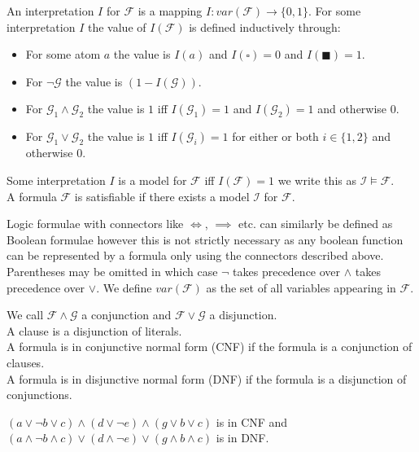 \begin{definition}
An interpretation $I$ for $\mathcal{F}$ is a mapping $I\colon var(\mathcal{F}) \to \{0,1\}$.
For some interpretation $I$ the value of $I(\mathcal{F})$ is defined inductively through:
\begin{itemize}
    \item For some atom $a$ the value is $I(a)$ and $I\left(\square\right)=0$ and $I\left(\blacksquare\right)=1$.
    \item For $\neg\mathcal{G}$ the value is $\left(1-I(\mathcal{G})\right)$.
    \item For $\mathcal{G}_1 \land \mathcal{G}_2$ the value is $1$ iff $I(\mathcal{G}_1)=1$ and $I(\mathcal{G}_2)=1$  and otherwise $0$.
    \item For $\mathcal{G}_1 \lor \mathcal{G}_2$ the value is $1$ iff $I(\mathcal{G}_i)=1$ for either or both $i\in\{1,2\}$ and otherwise $0$.
\end{itemize}

Some interpretation $I$ is a model for $\mathcal{F}$ iff $I(\mathcal{F})=1$ we write this as $\mathcal{I}\vDash\mathcal{F}$.\\
A formula $\mathcal{F}$ is satisfiable if there exists a model $\mathcal{I}$ for $\mathcal{F}$.
\end{definition}

Logic formulae with connectors like $\iff$, $\implies$ etc. can similarly be defined as Boolean formulae however this is not strictly necessary as any boolean function can be represented by a formula only using the connectors described above. Parentheses may be omitted in which case $\neg$ takes precedence over $\land$ takes precedence over $\lor$. We define $var(\mathcal{F})$ as the set of all variables appearing in  $\mathcal{F}$.
\begin{definition}
We call $\mathcal{F}\land\mathcal{G}$  a conjunction and $\mathcal{F}\lor\mathcal{G}$ a disjunction.\\
A clause is a disjunction of literals.\\
A formula is in conjunctive normal form (CNF) if the formula is a conjunction of clauses.\\
A formula is in disjunctive normal form (DNF) if the formula is a disjunction of conjunctions.
\end{definition}
\begin{example}
$\left(a \lor \neg b \lor c\right)\land\left(d \lor \neg e\right)\land\left(g \lor b \lor c\right)$ is in CNF and\\
$\left(a \land \neg b \land c\right)\lor\left(d \land \neg e\right)\lor\left(g \land b \land c\right)$ is in DNF.\\
\end{example}



